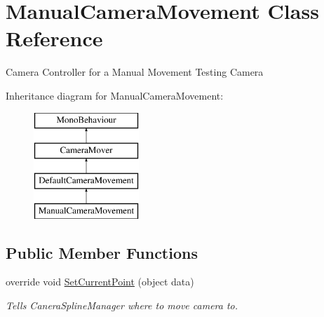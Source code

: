 \hypertarget{class_manual_camera_movement}{}\section{Manual\+Camera\+Movement Class Reference}
\label{class_manual_camera_movement}


Camera Controller for a Manual Movement Testing Camera  


Inheritance diagram for Manual\+Camera\+Movement\+:\begin{figure}[H]
\begin{center}
\leavevmode
\includegraphics[height=4.000000cm]{class_manual_camera_movement}
\end{center}
\end{figure}
\subsection*{Public Member Functions}
\begin{DoxyCompactItemize}
\item 
override void \mbox{\hyperlink{class_manual_camera_movement_a5c0dbb93ee2c14d66e55c1ce090a8bb4}{Set\+Current\+Point}} (object data)
\begin{DoxyCompactList}\small\item\em Tells Canera\+Spline\+Manager where to move camera to. \end{DoxyCompactList}\end{DoxyCompactItemize}
